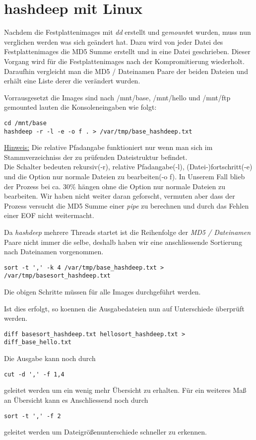 \section{hashdeep mit Linux}
Nachdem die Festplattenimages mit \textit{dd} erstellt und ge\textit{mount}et wurden, muss nun verglichen werden was sich geändert hat.
Dazu wird von jeder Datei des Festplattenimages die MD5 Summe erstellt und in eine Datei geschrieben.
Dieser Vorgang wird für die Festplattenimages nach der Kompromitierung wiederholt.
Daraufhin vergleicht man die MD5 / Dateinamen Paare der beiden Dateien und erhält eine Liste derer die verändert wurden.

Vorrausgesetzt die Images sind nach /mnt/base, /mnt/hello und /mnt/ftp gemounted lauten die Konsoleneingaben wie folgt:
\begin{lstlisting}
cd /mnt/base
hashdeep -r -l -e -o f . > /var/tmp/base_hashdeep.txt
\end{lstlisting}
\underline{Hinweis:} Die relative Pfadangabe funktioniert nur wenn man sich im Stammverzeichniss der zu prüfenden Dateistruktur befindet.\\[3mm]
Die Schalter bedeuten rekursiv(-r), relative Pfadangabe(-l), (Datei-)fortschritt(-e) und die Option nur normale Dateien zu bearbeiten(-o f).
In Unserem Fall blieb der Prozess bei ca. 30\% hängen ohne die Option nur normale Dateien zu bearbeiten.
Wir haben nicht weiter daran geforscht, vermuten aber dass der Prozess versucht die MD5 Summe einer \textit{pipe} zu berechnen und durch das Fehlen einer EOF nicht weitermacht.

Da \textit{hashdeep} mehrere Threads startet ist die Reihenfolge der \textit{MD5 / Dateinamen} Paare nicht immer die selbe, deshalb haben wir eine anschliessende Sortierung nach Dateinamen vorgenommen.
\begin{lstlisting}
sort -t ',' -k 4 /var/tmp/base_hashdeep.txt > /var/tmp/basesort_hashdeep.txt
\end{lstlisting}

Die obigen Schritte müssen für alle Images durchgeführt werden.

Ist dies erfolgt, so koennen die Ausgabedateien nun auf Unterschiede überprüft werden.
\begin{lstlisting}
diff basesort_hashdeep.txt hellosort_hashdeep.txt > diff_base_hello.txt
\end{lstlisting}
Die Ausgabe kann noch  durch 
\begin{lstlisting}
cut -d ',' -f 1,4 
\end{lstlisting}
geleitet werden um ein wenig mehr Übersicht zu erhalten.
Für ein weiteres Maß an Übersicht kann es Anschliessend noch durch
\begin{lstlisting}
sort -t ',' -f 2 
\end{lstlisting}
geleitet werden um Dateigrößenunterschiede schneller zu erkennen.
